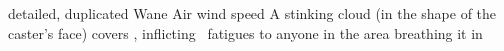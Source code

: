   {detailed, duplicated}%
  {Wane}%
  {Air}%
  {wind speed}%
  {A stinking cloud (in the shape of the caster's face) covers , inflicting ~\glspl{fatigue} to anyone in the area breathing it in}%
  {}
